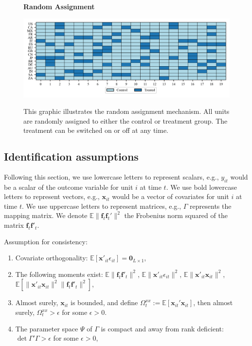 \documentclass[12pt]{article}
\begin{document}
\begin{figure}[!ht]
\centering
\caption{\textbf{Random Assignment}}
\includegraphics{figs/random_assignment.png}
\label{app: random assignment}
\caption*{\footnotesize{This graphic illustrates the random assignment mechanism. All units are randomly assigned to either the control or treatment group. The treatment can be switched on or off at any time.}}
\end{figure}

\subsection{Identification assumptions}

Following this section, we use lowercase letters to represent scalars, e.g., $y_{it}$ would be a scalar of the outcome variable for unit $i$ at time $t$. We use bold lowercase letters to represent vectors, e.g., $\bm{x}_{it}$ would be a vector of covariates for unit $i$ at time $t$. We use uppercase letters to represent matrices, e.g., $\Gamma$ represents the mapping matrix. We denote $\mathbb{E}\|\bm{f}_t\bm{f}_t'\|^2$ the Frobenius norm squared of the matrix $\bm{f}_t\bm{f}'_t$.

\begin{assumption}
Assumption for consistency:
\begin{enumerate}
    \item Covariate orthogonality: $\mathbb{E}\left[\textbf{x}'_{it} \epsilon_{it}\right] = \textbf{0}_{L\times 1}$,
    
    \item The following moments exist: $\mathbb{E}\|\bm{f}_{t}\bm{f}'_{t}\|^2$, $\mathbb{E}\|\bm{x}'_{it}\epsilon_{it}\|^2$, $\mathbb{E}\|\bm{x}'_{it}\bm{x}_{it}\|^2$, $\mathbb{E}\left[\|\bm{x}'_{it}\bm{x}_{it}\|^2\|\bm{f}_{t}\bm{f}'_{t}\|^2 \right]$, 

    \item Almost surely, $\bm{x}_{it}$ is bounded, and define $\Omega_t^{xx} := \mathbb{E}\left[ \bm{x}_{it}' \bm{x}_{it} \right]$, then almost surely, $\Omega_t^{xx} > \epsilon$ for some $\epsilon > 0$.
    
    \item The parameter space $\Psi$ of $\Gamma$ is compact and away from rank deficient: $\det{\Gamma' \Gamma} > \epsilon$ for some $\epsilon>0$,
    
\end{enumerate}
\label{app: ass consistency}
\end{assumption}
\end{document}
